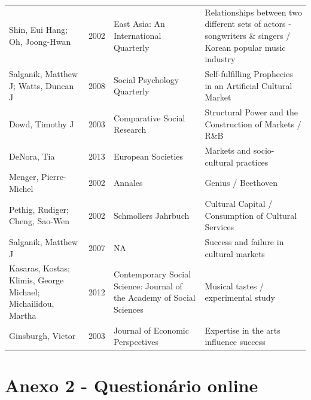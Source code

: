 \documentclass[a4paper, 12pt, openright, oneside, german, french, english, brazil]{abntex2}
\begin{document}
\begin{SingleSpace}
\begin{footnotesize}
\begin{center}
\begin{longtable}{p{4cm}lp{4cm}p{4cm}}
		Shin, Eui Hang; Oh, Joong-Hwan & 2002 & East Asia: An International Quarterly & Relationships between two different sets of actors - songwriters \& singers / Korean popular music industry\\

		Salganik, Matthew J; Watts, Duncan J & 2008 & Social Psychology Quarterly & Self-fulfilling Prophecies in an Artificial Cultural Market\\

		Dowd, Timothy J & 2003 & Comparative Social Research & Structural Power and the Construction of Markets / R\&B\\

		DeNora, Tia & 2013 & European Societies & Markets and socio-cultural practices\\

		Menger, Pierre-Michel & 2002 & Annales & Genius / Beethoven\\

		Pethig, Rudiger; Cheng, Sao-Wen & 2002 & Schmollers Jahrbuch & Cultural Capital / Consumption of Cultural Services\\

		Salganik, Matthew J & 2007 & NA & Success and failure in cultural markets\\

		Kasaras, Kostas; Klimis, George Michael; Michailidou, Martha & 2012 & Contemporary Social Science: Journal of the Academy of Social Sciences & Musical tastes / experimental study\\

		Ginsburgh, Victor & 2003 & Journal of Economic Perspectives & Expertise in the arts influence success\\



	\end{longtable}

\end{center}

\end{footnotesize}

\end{SingleSpace}






	\chapter*[Anexo 2]{Anexo 2 - Questionário online}

\end{document}
